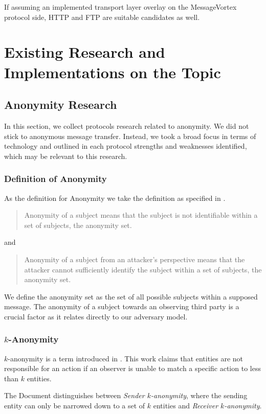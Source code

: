 If assuming an implemented transport layer overlay on the MessageVortex protocol side, HTTP and FTP are suitable candidates as well.

\chapter{Existing Research and Implementations on the Topic \label{sec:existingRD}}
\section{Anonymity Research}
In this section, we collect protocols research related to anonymity. We did not stick to anonymous message transfer. Instead, we took a broad focus in terms of technology and outlined in each protocol strengths and weaknesses identified, which may be relevant to this research.

\subsection{Definition of Anonymity}
As the definition for Anonymity we take the definition as specified in \cite{anonTerminology}.
\begin{quote}
	Anonymity of a subject means that the subject is not identifiable within a set of subjects, the anonymity set.\omitted
\end{quote}
and
\begin{quote}
	Anonymity of a subject from an attacker's perspective means that the attacker cannot sufficiently identify the subject within a set of subjects, the anonymity set.\omitted
\end{quote}

We define the anonymity set as the set of all possible subjects within a supposed message. The anonymity of a subject towards an observing third party is a crucial factor as it relates directly to our adversary model.

\subsection{\texorpdfstring{$k$}{k}-Anonymity}
$k$-anonymity is a term introduced in \cite{k-anonymous:ccs2003}. This work claims that entities are not responsible for an action if an observer is unable to match a specific action to less than $k$ entities.

The Document distinguishes between \textit{Sender $k$-anonymity}, where the sending entity can only be narrowed down to a set of $k$ entities and \textit{Receiver $k$-anonymity}. 

